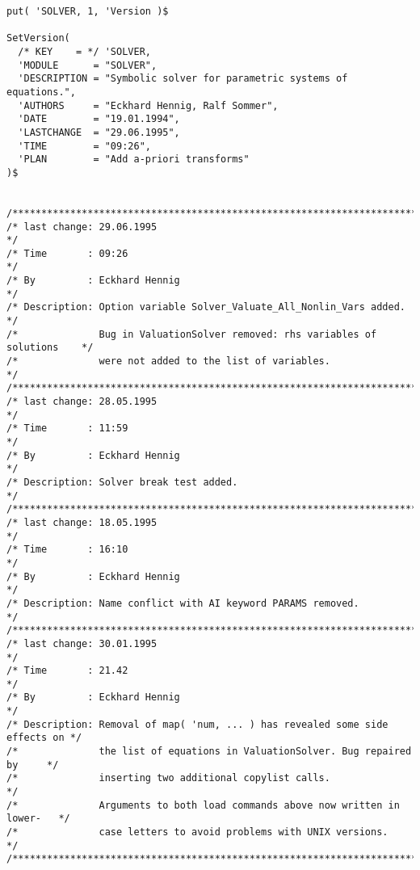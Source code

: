 \begin{verbatim}
put( 'SOLVER, 1, 'Version )$

SetVersion(
  /* KEY    = */ 'SOLVER,
  'MODULE      = "SOLVER",
  'DESCRIPTION = "Symbolic solver for parametric systems of equations.",
  'AUTHORS     = "Eckhard Hennig, Ralf Sommer",
  'DATE        = "19.01.1994",
  'LASTCHANGE  = "29.06.1995",
  'TIME        = "09:26",
  'PLAN        = "Add a-priori transforms"
)$


/******************************************************************************/
/* last change: 29.06.1995                                                    */
/* Time       : 09:26                                                         */
/* By         : Eckhard Hennig                                                */
/* Description: Option variable Solver_Valuate_All_Nonlin_Vars added.         */
/*              Bug in ValuationSolver removed: rhs variables of solutions    */
/*              were not added to the list of variables.                      */
/******************************************************************************/
/* last change: 28.05.1995                                                    */
/* Time       : 11:59                                                         */
/* By         : Eckhard Hennig                                                */
/* Description: Solver break test added.                                      */
/******************************************************************************/
/* last change: 18.05.1995                                                    */
/* Time       : 16:10                                                         */
/* By         : Eckhard Hennig                                                */
/* Description: Name conflict with AI keyword PARAMS removed.                 */
/******************************************************************************/
/* last change: 30.01.1995                                                    */
/* Time       : 21.42                                                         */
/* By         : Eckhard Hennig                                                */
/* Description: Removal of map( 'num, ... ) has revealed some side effects on */
/*              the list of equations in ValuationSolver. Bug repaired by     */
/*              inserting two additional copylist calls.                      */
/*              Arguments to both load commands above now written in lower-   */
/*              case letters to avoid problems with UNIX versions.            */
/******************************************************************************/

\end{verbatim}
